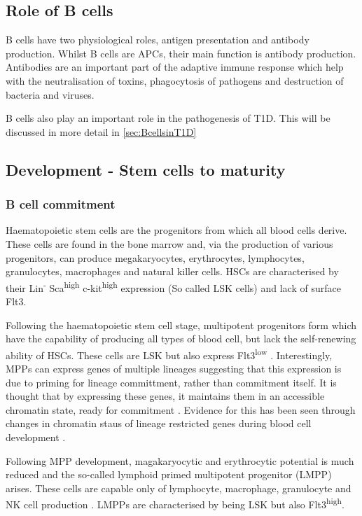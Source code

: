 \subsection{Role of B cells}
\label{subsec:Bcellrole}
B cells have two physiological roles, antigen presentation and antibody production.
Whilst B cells are APCs, their main function is antibody production.
Antibodies are an important part of the adaptive immune response which help with the neutralisation of toxins, phagocytosis of pathogens and destruction of bacteria and viruses.

B cells also play an important role in the pathogenesis of T1D. 
This will be discussed in more detail in \cref{sec:BcellsinT1D}

\subsection{Development - Stem cells to maturity}
\label{subsec:Bcelldevelopment}
\subsubsection{B cell commitment}

Haematopoietic stem cells are the progenitors from which all blood cells derive.
These cells are found in the bone marrow and, via the production of various progenitors, can produce megakaryocytes, erythrocytes, lymphocytes, granulocytes, macrophages and natural killer cells.
HSCs are characterised by their Lin\textsuperscript{-} Sca\textsuperscript{high} c-kit\textsuperscript{high} expression (So called LSK cells) and lack of surface Flt3\citep{Welinder2011}.

Following the haematopoietic stem cell stage, multipotent progenitors form which have the capability of producing all types of blood cell, but lack the self-renewing ability of HSCs.
These cells are LSK but also express Flt3\textsuperscript{low} \citep{Welinder2011}.
Interestingly, MPPs can express genes of multiple lineages \citep{Hu1997} suggesting that this expression is due to priming for lineage committment, rather than commitment itself.
It is thought that by expressing these genes, it maintains them in an accessible chromatin state, ready for commitment \citep{Welinder2011}.
Evidence for this has been seen through changes in chromatin staus of lineage restricted genes during blood cell development \citep{Weishaupt2010}.

Following MPP development, magakaryocytic and erythrocytic potential is much reduced and the so-called lymphoid primed multipotent progenitor (LMPP) arises.
These cells are capable only of lymphocyte, macrophage, granulocyte and NK cell production \citep{Adolfsson2005}.
LMPPs are characterised by being LSK but also Flt3\textsuperscript{high}.

